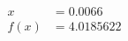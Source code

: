 \documentclass[preview]{standalone}
\begin{document}
\begin{align*}
x &= 0.0066\\f(x) &= 4.0185622
\end{align*}
\end{document}
